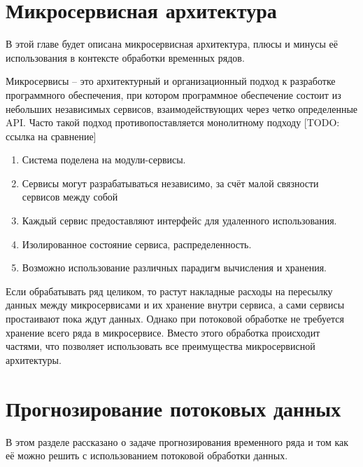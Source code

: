 \section{Микросервисная архитектура}
\begin{annotation}
	В этой главе будет описана микросервисная архитектура, плюсы и минусы её использования в контексте обработки временных рядов.
\end{annotation}

Микросервисы – это архитектурный и организационный подход к разработке программного обеспечения, при котором программное обеспечение состоит из небольших независимых сервисов, взаимодействующих через четко
определенные API. Часто такой подход противопоставляется монолитному подходу [TODO: ссылка на сравнение]

\begin{enumerate}
	\item Система поделена на модули-сервисы.
	\item Сервисы могут разрабатываться независимо, за счёт малой связности сервисов между собой
	\item Каждый сервис предоставляют интерфейс для удаленного использования.
	\item Изолированное состояние сервиса, распределенность.
	\item Возможно использование различных парадигм вычисления и хранения.
\end{enumerate}


Если обрабатывать ряд целиком, то растут накладные расходы на пересылку данных между микросервисами и их хранение внутри сервиса, а сами сервисы простаивают пока ждут данных. 
Однако при потоковой обработке не требуется хранение всего ряда в микросервисе. Вместо этого обработка происходит частями, что позволяет использовать все преимущества микросервисной архитектуры.

\section{Прогнозирование потоковых данных}
\begin{annotation}
	В этом разделе рассказано о задаче прогнозирования временного ряда и том как её можно решить с использованием потоковой обработки данных.
\end{annotation}

